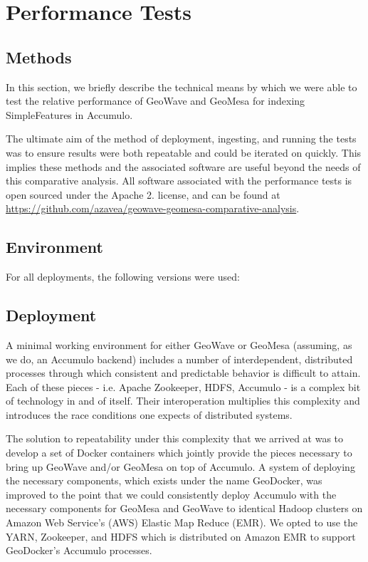 \section{Performance Tests}
\label{sec:performance}


\subsection{Methods}
\label{sec:performance:methods}

In this section, we briefly describe the technical means by which we were able to test the relative performance of GeoWave and GeoMesa for indexing SimpleFeatures in Accumulo.

The ultimate aim of the method of deployment, ingesting, and running the tests was to ensure results were both repeatable and could be iterated on quickly.
This implies these methods and the associated software are useful beyond the needs of this comparative analysis.
All software associated with the performance tests is open sourced under the Apache 2.
license, and can be found at \url{https://github.com/azavea/geowave-geomesa-comparative-analysis}.


\subsection{Environment}
\label{sec:performance:environment}

For all deployments, the following versions were used:


\subsection{Deployment}
\label{sec:performance:deployment}

A minimal working environment for either GeoWave or GeoMesa (assuming, as we do, an Accumulo backend) includes a number of interdependent, distributed processes through which consistent and predictable behavior is difficult to attain.
Each of these pieces - i.e. Apache Zookeeper, HDFS, Accumulo - is a complex bit of technology in and of itself. Their interoperation multiplies this complexity and introduces the race conditions one expects of distributed systems.

The solution to repeatability under this complexity that we arrived at was to develop a set of Docker containers which jointly provide the pieces necessary to bring up GeoWave and/or GeoMesa on top of Accumulo.
A system of deploying the necessary components, which exists under the name GeoDocker, was improved to the point that we could consistently deploy Accumulo with the necessary components for GeoMesa and GeoWave to identical Hadoop clusters on Amazon Web Service's (AWS) Elastic Map Reduce (EMR).
We opted to use the YARN, Zookeeper, and HDFS which is distributed on Amazon EMR to support GeoDocker’s Accumulo processes.

